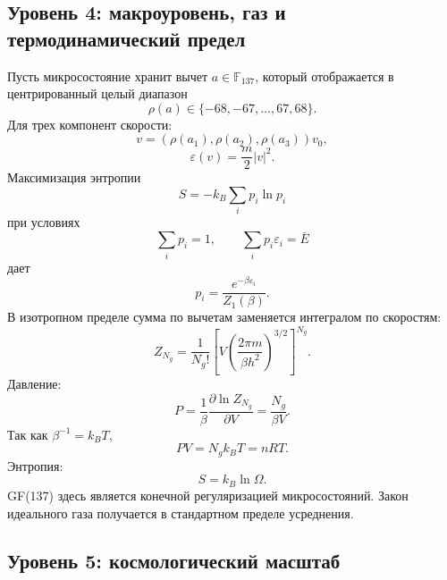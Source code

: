 \documentclass[11pt]{article}
\begin{document}
\subsection{Уровень 4: макроуровень, газ и термодинамический предел}

Пусть микросостояние хранит вычет $a\in\mathbb{F}_{137}$, который отображается
в центрированный целый диапазон
\begin{equation}
    \rho(a)\in\{-68,-67,\ldots,67,68\}.
\end{equation}
Для трех компонент скорости:
\begin{equation}
    v=(\rho(a_1),\rho(a_2),\rho(a_3))v_0,
\end{equation}
\begin{equation}
    \varepsilon(v)=\frac{m}{2}|v|^2.
\end{equation}
Максимизация энтропии
\begin{equation}
    S=-k_B\sum_i p_i\ln p_i
\end{equation}
при условиях
\begin{equation}
    \sum_i p_i=1,\qquad \sum_i p_i\varepsilon_i=\bar{E}
\end{equation}
дает
\begin{equation}
    p_i=\frac{e^{-\beta\varepsilon_i}}{Z_1(\beta)}.
\end{equation}
В изотропном пределе сумма по вычетам заменяется интегралом по скоростям:
\begin{equation}
    Z_{N_g}
    =
    \frac{1}{N_g!}
    \left[
        V\left(\frac{2\pi m}{\beta h^2}\right)^{3/2}
    \right]^{N_g}.
\end{equation}
Давление:
\begin{equation}
    P=\frac{1}{\beta}\frac{\partial \ln Z_{N_g}}{\partial V}
      =
    \frac{N_g}{\beta V}.
\end{equation}
Так как $\beta^{-1}=k_BT$,
\begin{equation}
    PV=N_gk_BT=nRT.
\end{equation}
Энтропия:
\begin{equation}
    S=k_B\ln\Omega.
\end{equation}
GF(137) здесь является конечной регуляризацией микросостояний.  Закон
идеального газа получается в стандартном пределе усреднения.

\subsection{Уровень 5: космологический масштаб}
\end{document}
